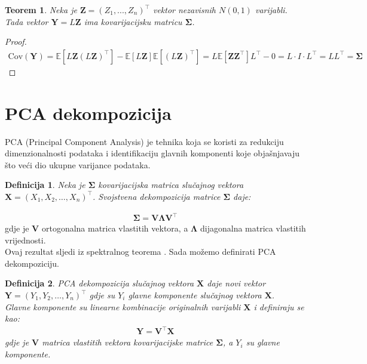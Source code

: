 \documentclass[zavrsnirad]{fer}
\newtheorem{definition}{Definicija}
\newtheorem{theorem}{Teorem}
\newtheorem{proof}{Dokaz}
\begin{document}
\begin{theorem}
Neka je $\mathbf{Z} = (Z_1, ..., Z_n)^\intercal$ vektor nezavisnih $N(0,1)$ varijabli. Tada vektor $\mathbf{Y} = L\mathbf{Z}$ ima kovarijacijsku matricu $\boldsymbol{\Sigma}$.
\end{theorem}
\begin{proof}
\begin{align*}
\text{Cov}(\mathbf{Y}) = \mathbb{E}[L\mathbf{Z}(L\mathbf{Z})^\intercal] -
    \mathbb{E}[L\mathbf{Z}]\mathbb{E}[(L\mathbf{Z})^\intercal]
    = L\mathbb{E}[\mathbf{Z}\mathbf{Z}^\intercal]L^\intercal - 0
    = L \cdot I \cdot L^\intercal = LL^\intercal = \boldsymbol{\Sigma}
\end{align*}
\end{proof}

\section{PCA dekompozicija}
\label{sek:pca}
PCA (Principal Component Analysis) je tehnika koja se koristi za
redukciju dimenzionalnosti podataka i identifikaciju glavnih komponenti koje
objašnjavaju što veći dio ukupne varijance podataka.
\begin{definition}
    Neka je $\boldsymbol{\Sigma}$ kovarijacijska matrica slučajnog
    vektora $\mathbf{X} = (X_1, X_2, \dots, X_n)^\intercal$.
    Svojstvena dekompozicija matrice
    $\boldsymbol{\Sigma}$ daje:
\end{definition}
\begin{align*}
    \boldsymbol{\Sigma} = \boldsymbol{V} \boldsymbol{\Lambda} \boldsymbol{V}^\intercal
\end{align*}
\indent gdje je $\boldsymbol{V}$ ortogonalna matrica vlastitih vektora, a
$\boldsymbol{\Lambda}$
dijagonalna matrica vlastitih vrijednosti.\\

\noindent Ovaj rezultat sljedi iz spektralnog teorema \cite{NumerickaLinearna}.
Sada možemo definirati PCA dekompoziciju.
\begin{definition}
    PCA dekompozicija slučajnog vektora $\mathbf{X}$ daje novi vektor
    $\mathbf{Y} = (Y_1, Y_2, \dots, Y_n)^\intercal$ gdje su $Y_i$
    glavne komponente slučajnog vektora $\mathbf{X}$.\\
    Glavne komponente su linearne kombinacije originalnih varijabli
    $\mathbf{X}$ i definiraju se kao:
    \begin{align*}
        \mathbf{Y} = \boldsymbol{V}^\intercal \mathbf{X}
    \end{align*}
    \indent gdje je $\boldsymbol{V}$ matrica vlastitih vektora kovarijacijske
    matrice $\boldsymbol{\Sigma}$, a $Y_i$ su glavne komponente.
\end{definition}
\end{document}
